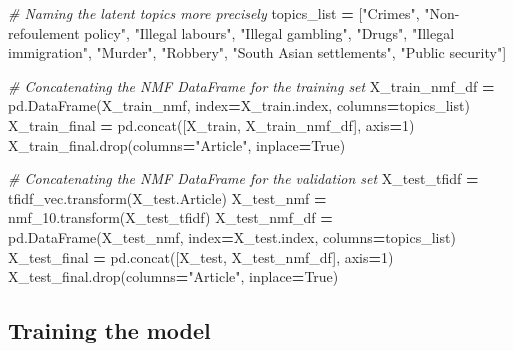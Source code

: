 \documentclass[a4paper, oneside]{report}
\newenvironment{Shaded}{\begin{snugshade}}{\end{snugshade}}
\newcommand{\CommentTok}[1]{\textcolor[rgb]{0.56,0.35,0.01}{\textit{#1}}}
\newcommand{\DecValTok}[1]{\textcolor[rgb]{0.00,0.00,0.81}{#1}}
\newcommand{\NormalTok}[1]{#1}
\newcommand{\OperatorTok}[1]{\textcolor[rgb]{0.81,0.36,0.00}{\textbf{#1}}}
\newcommand{\StringTok}[1]{\textcolor[rgb]{0.31,0.60,0.02}{#1}}
\newcommand{\VariableTok}[1]{\textcolor[rgb]{0.00,0.00,0.00}{#1}}
\renewenvironment{Shaded}
{
  \vspace{4pt}%
  \begin{snugshade}%
}{%
  \end{snugshade}%
  \vspace{4pt}%
}
\begin{document}
\begin{Shaded}
\begin{Highlighting}[]
\CommentTok{\# Naming the latent topics more precisely}
\NormalTok{topics\_list }\OperatorTok{=}\NormalTok{ [}\StringTok{"Crimes"}\NormalTok{, }\StringTok{"Non{-}refoulement policy"}\NormalTok{, }\StringTok{"Illegal labours"}\NormalTok{, }\StringTok{"Illegal gambling"}\NormalTok{, }\StringTok{"Drugs"}\NormalTok{, }\StringTok{"Illegal immigration"}\NormalTok{, }\StringTok{"Murder"}\NormalTok{, }\StringTok{"Robbery"}\NormalTok{, }\StringTok{"South Asian settlements"}\NormalTok{, }\StringTok{"Public security"}\NormalTok{]}

\CommentTok{\# Concatenating the NMF DataFrame for the training set}
\NormalTok{X\_train\_nmf\_df }\OperatorTok{=}\NormalTok{ pd.DataFrame(X\_train\_nmf, index}\OperatorTok{=}\NormalTok{X\_train.index, columns}\OperatorTok{=}\NormalTok{topics\_list)}
\NormalTok{X\_train\_final }\OperatorTok{=}\NormalTok{ pd.concat([X\_train, X\_train\_nmf\_df], axis}\OperatorTok{=}\DecValTok{1}\NormalTok{)}
\NormalTok{X\_train\_final.drop(columns}\OperatorTok{=}\StringTok{"Article"}\NormalTok{, inplace}\OperatorTok{=}\VariableTok{True}\NormalTok{)}

\CommentTok{\# Concatenating the NMF DataFrame for the validation set}
\NormalTok{X\_test\_tfidf }\OperatorTok{=}\NormalTok{ tfidf\_vec.transform(X\_test.Article)}
\NormalTok{X\_test\_nmf }\OperatorTok{=}\NormalTok{ nmf\_10.transform(X\_test\_tfidf)}
\NormalTok{X\_test\_nmf\_df }\OperatorTok{=}\NormalTok{ pd.DataFrame(X\_test\_nmf, index}\OperatorTok{=}\NormalTok{X\_test.index, columns}\OperatorTok{=}\NormalTok{topics\_list)}
\NormalTok{X\_test\_final }\OperatorTok{=}\NormalTok{ pd.concat([X\_test, X\_test\_nmf\_df], axis}\OperatorTok{=}\DecValTok{1}\NormalTok{)}
\NormalTok{X\_test\_final.drop(columns}\OperatorTok{=}\StringTok{"Article"}\NormalTok{, inplace}\OperatorTok{=}\VariableTok{True}\NormalTok{)}
\end{Highlighting}
\end{Shaded}

\hypertarget{training-the-model}{%
\subsection{Training the model}\label{training-the-model}}
\end{document}
